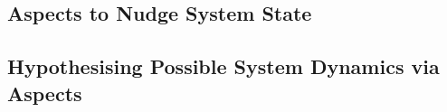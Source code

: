 






\subsection{Aspects to Nudge System State}
\label{future_work_using_aspects_to_correct_simulated_state}





\subsection{Hypothesising Possible System Dynamics via Aspects}


